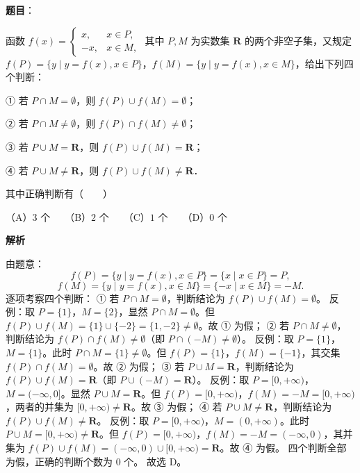 \begin{answer}

\textbf{题目}：

函数 $f(x)=\begin{cases} x, & x\in P, \\ -x, & x\in M, \end{cases}$ 其中 $P, M$ 为实数集 $\mathbf{R}$ 的两个非空子集，又规定 $f(P)=\{y\mid y=f(x), x\in P\}$，$f(M)=\{y\mid y=f(x), x\in M\}$，给出下列四个判断：

① 若 $P\cap M=\emptyset$，则 $f(P)\cup f(M)=\emptyset$；

② 若 $P\cap M\neq\emptyset$，则 $f(P)\cap f(M)\neq\emptyset$；

③ 若 $P\cup M=\mathbf{R}$，则 $f(P)\cup f(M)=\mathbf{R}$；

④ 若 $P\cup M\neq\mathbf{R}$，则 $f(P)\cup f(M)\neq\mathbf{R}$．

其中正确判断有\mbox{（　　）}

（A）$3$ 个　　（B）$2$ 个　　（C）$1$ 个　　（D）$0$ 个

\textbf{解析}

由题意：
\nopagebreak[4]
\[
f(P)=\{y\mid y=f(x), x\in P\}=\{x\mid x\in P\}=P,
\]
\nopagebreak[4]
\[
f(M)=\{y\mid y=f(x), x\in M\}=\{-x\mid x\in M\}=-M.
\]
逐项考察四个判断：
① 若 $P\cap M=\emptyset$，判断结论为 $f(P)\cup f(M)=\emptyset$。
反例：取 $P=\{1\}$，$M=\{2\}$，显然 $P\cap M=\emptyset$。但 $f(P)\cup f(M)=\{1\}\cup\{-2\}=\{1, -2\}\neq\emptyset$。故 ① 为假；
② 若 $P\cap M\neq\emptyset$，判断结论为 $f(P)\cap f(M)\neq\emptyset$（即 $P\cap (-M)\neq\emptyset$）。
反例：取 $P=\{1\}$，$M=\{1\}$。此时 $P\cap M=\{1\}\neq\emptyset$。但 $f(P)=\{1\}$，$f(M)=\{-1\}$，其交集 $f(P)\cap f(M)=\emptyset$。故 ② 为假；
③ 若 $P\cup M=\mathbf{R}$，判断结论为 $f(P)\cup f(M)=\mathbf{R}$（即 $P\cup (-M)=\mathbf{R}$）。
反例：取 $P=[0, +\infty)$，$M=(-\infty, 0]$。显然 $P\cup M=\mathbf{R}$。但 $f(P)=[0, +\infty)$，$f(M)=-M=[0, +\infty)$，两者的并集为 $[0, +\infty)\neq\mathbf{R}$。故 ③ 为假；
④ 若 $P\cup M\neq\mathbf{R}$，判断结论为 $f(P)\cup f(M)\neq\mathbf{R}$。
反例：取 $P=[0, +\infty)$，$M=(0, +\infty)$。此时 $P\cup M=[0, +\infty)\neq\mathbf{R}$。但 $f(P)=[0, +\infty)$，$f(M)=-M=(-\infty, 0)$，其并集为 $f(P)\cup f(M)=(-\infty, 0)\cup [0, +\infty)=\mathbf{R}$。故 ④ 为假。
四个判断全部为假，正确的判断个数为 0 个。
故选 D。


\end{answer}
